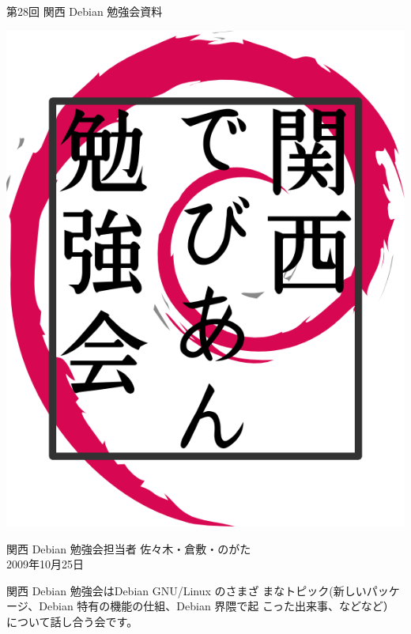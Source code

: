 \documentclass[mingoth,a4paper]{jsarticle}
\newcommand{\debmtgyear}{2009}
\newcommand{\debmtgdate}{25}
\newcommand{\debmtgmonth}{10}
\newcommand{\debmtgnumber}{28}
\begin{document}
\begin{titlepage}


 第\debmtgnumber{}回 関西 Debian 勉強会資料

\vspace{2cm}

\begin{center}
\includegraphics{image200802/kansaidebianlogo.png}
\end{center}

\begin{flushright}
\hfill{}関西 Debian 勉強会担当者 佐々木・倉敷・のがた\\
\hfill{}\debmtgyear{}年\debmtgmonth{}月\debmtgdate{}日
\end{flushright}

\thispagestyle{empty}
\end{titlepage}


 関西 Debian 勉強会はDebian GNU/Linux のさまざ
 まなトピック(新しいパッケージ、Debian 特有の機能の仕組、Debian 界隈で起
 こった出来事、などなど）について話し合う会です。
\end{document}
